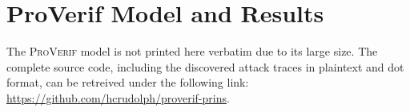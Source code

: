 \chapter{ProVerif Model and Results}

The \textsc{ProVerif} model is not printed here verbatim due to its large size.
The complete source code, including the discovered attack traces in plaintext and dot format, can be retreived under the following link: \url{https://github.com/hcrudolph/proverif-prins}.